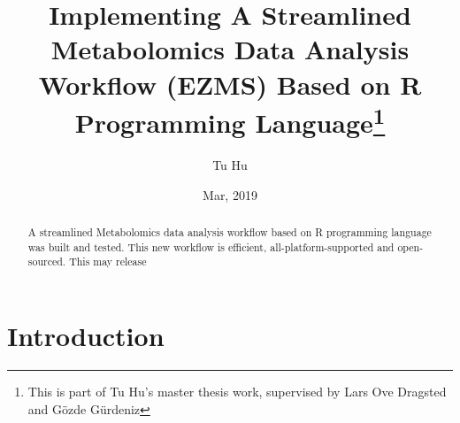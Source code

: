 \documentclass[]{article}
\title{Implementing A Streamlined Metabolomics Data Analysis Workflow (EZMS) Based on R Programming Language\footnote{This is part of Tu Hu's master thesis work, supervised by Lars Ove Dragsted and Gözde Gürdeniz}}
\author{Tu Hu}
\date{Mar, 2019}
\begin{document}
\maketitle

\begin{abstract}
A streamlined Metabolomics data analysis workflow based on R programming language was built and tested. This new workflow is efficient, all-platform-supported and open-sourced. This may release
\end{abstract}

\section{Introduction}
\end{document}
